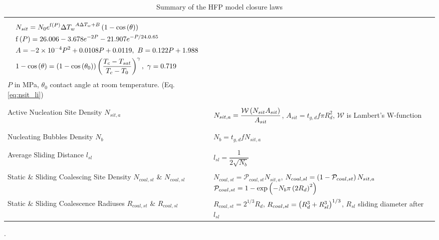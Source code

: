 \begin{table}[H]
\begin{center}
\begin{tabular}{p{40mm}|p{100mm}}
{\begin{align*}
&N_{sit} = N_{0}e^{\mathrm{f}\parth{P}} {\Delta T_{w}}^{A\Delta T_{w} + B} \parth{1- \cos{\theta}}\\
%
&\mathrm{f}\parth{P} = 26.006 - 3.678 e^{-2P} - 21.907e^{-P / 24.0.65}\\
%
&A = -2\times 10^{-4} P^{2} + 0.0108P + 0.0119,\ B = 0.122P +1.988\\
%
&1-\cos{\theta} = \parth{1-\cos{\theta_{0}}}\parth{\dfrac{T_{c}-T_{sat}}{T_{c}-T_{0}}}^{\gamma},\ \gamma = 0.719
\end{align*}
$P$ in MPa, $\theta_{0}$ contact angle at room temperature. (Eq. \ref{eq:nsit_li})
}\\
\\
\hline
\\
%
{Active Nucleation Site Density $N_{sit,a}$ } & {
$N_{sit,a} = \dfrac{\mathcal{W}\left( N_{sit}A_{sit} \right)}{A_{sit}}$, $A_{sit} = t_{g,d} f \pi R_{d}^{2}$, $\mathcal{W}$ is Lambert's W-function
}\\
\\
\hline
\\
%
{Nucleating Bubbles Density $N_{b}$ } & {
$N_{b} = t_{g,d} f N_{sit,a}$
}\\
\\
\hline
\\
%
{Average Sliding Distance $l_{sl}$ } & {
$l_{sl} = \dfrac{1}{2\sqrt{N_{b}}}$
}\\
\\
\hline
%
{Static \& Sliding Coalescing Site Density $N_{coal,st}$ \& $N_{coal,sl}$} & {
$N_{coal,st} = \mathcal{P}_{coal,st}N_{sit,a}$, $N_{coal,sl} = \left( 1-\mathcal{P}_{coal,st} \right)N_{sit,a}$\newline
$\mathcal{P}_{coal,st} = 1- \mathrm{exp}\left( -N_{b}\pi \left( 2R_{d} \right)^{2} \right)$
}\\
\hline
%
{Static \& Sliding Coalescence Radiuses $R_{coal,st}$ \& $R_{coal,sl}$} & {
$R_{coal,st} = 2^{1/3}R_{d}$, $R_{coal,sl}=\left( R_{d}^{3} + R_{sl}^{3} \right)^{1/3}$, $R_{sl}$ sliding diameter after $l_{sl}$
}\\
\hline

\end{tabular}
\end{center}
\caption{Summary of the HFP model closure laws}
\label{tab:HFP_closures}.
\end{table}





